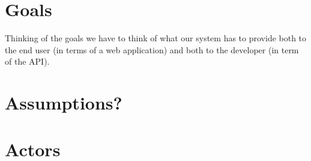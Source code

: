 	\section{Goals}
	Thinking of the goals we have to think of what our system has to provide both to the end user 
	(in terms of a web application) and both to the developer (in term of the API).

	\section{Assumptions?}

	\section{Actors}